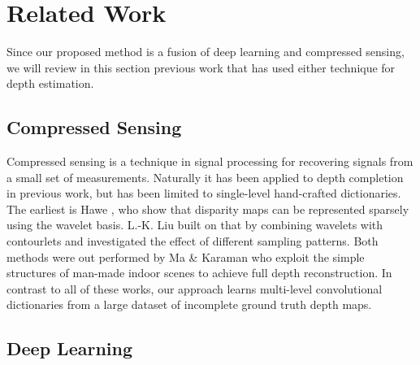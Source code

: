 \section{Related Work}
\label{sec:related-work}

Since our proposed method is a fusion of deep learning and compressed sensing, we will review in this section previous work that has used either technique for depth estimation.

\subsection{Compressed Sensing}
\label{sec:compressed-sensing}


Compressed sensing is a technique in signal processing for recovering signals from a small set of measurements. Naturally it has been applied to depth completion in previous work, but has been limited to single-level hand-crafted dictionaries. The earliest is Hawe \etal, who show that disparity maps can be represented sparsely using the wavelet basis\cite{hawe2011dense}. L.-K. Liu \etal built on that by combining wavelets with contourlets and investigated the effect of different sampling patterns\cite{liu2015depth}. Both methods were out performed by Ma \& Karaman who exploit the simple structures of man-made indoor scenes to achieve full depth reconstruction\cite{ma2016sparse}. In contrast to all of these works, our approach learns multi-level convolutional dictionaries from a large dataset of incomplete ground truth depth maps.

\subsection{Deep Learning}
\label{sec:depth-upsampling}

